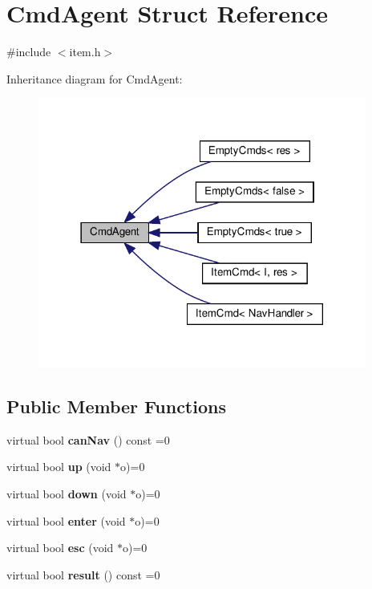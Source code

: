 \hypertarget{structCmdAgent}{}\section{Cmd\+Agent Struct Reference}
\label{structCmdAgent}


{\ttfamily \#include $<$item.\+h$>$}



Inheritance diagram for Cmd\+Agent\+:\nopagebreak
\begin{figure}[H]
\begin{center}
\leavevmode
\includegraphics[width=306pt]{structCmdAgent__inherit__graph}
\end{center}
\end{figure}
\subsection*{Public Member Functions}
\begin{DoxyCompactItemize}
\item 
\mbox{\label{structCmdAgent_a1a0eedb14708cc96c254922c545915c5}} 
virtual bool {\bfseries can\+Nav} () const =0
\item 
\mbox{\label{structCmdAgent_a310f823c00f4a7dc427a1d31f6158897}} 
virtual bool {\bfseries up} (void $\ast$o)=0
\item 
\mbox{\label{structCmdAgent_ae95a8096248043644ac58cba80a378b2}} 
virtual bool {\bfseries down} (void $\ast$o)=0
\item 
\mbox{\label{structCmdAgent_a673709ce059dbd54d86c61b0fdc9a17a}} 
virtual bool {\bfseries enter} (void $\ast$o)=0
\item 
\mbox{\label{structCmdAgent_a5fb6b466ecb88ebad13a1e1a1099ef21}} 
virtual bool {\bfseries esc} (void $\ast$o)=0
\item 
\mbox{\label{structCmdAgent_a4836801b65eaf6df12a72ccb8fe0834d}} 
virtual bool {\bfseries result} () const =0
\end{DoxyCompactItemize}


